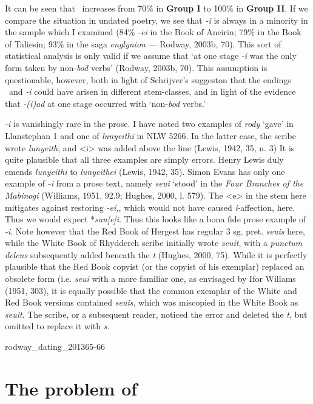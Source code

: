{It can be seen that \ei\ increases from 70\% in \textbf{Group I} to 100\% in \textbf{Group II}. If we compare the situation in undated poetry, we see that \textit{-i} is always in a minority in the sample which I examined (84\% \textit{-ei} in the Book of Aneirin; 79\% in the Book of Taliesin; 93\% in the saga \textit{englynion} --- Rodway, 2003b, 70). This sort of statistical analysis is only valid if we assume that `at one stage \textit{-i} was the only form taken by non-\textit{bod} verbs' (Rodway, 2003b, 70). This assumption is questionable, however, both in light of Schrijver's suggeston that the endings \ei\ and \textit{-i} could have arisen in different stem-classes, and in light of the evidence that \textit{-(i)ad} at one stage occurred with `non-\textit{bod} verbs.'

\textit{-i} is vanishingly rare in the prose. I have noted two examples of \textit{rody} `gave' in Llanstephan 1 and one of \textit{lunyeithi} in NLW 5266. In the latter case, the  scribe wrote \textit{lunyeith}, and <i> was added above the line (Lewis, 1942, 35, n. 3) It is quite plausible that all three examples are simply errors. Henry Lewis duly emends \textit{lunyeithi} to \textit{lunyeithei} (Lewis, 1942, 35). Simon Evans has only one example of \textit{-i} from a prose text, namely \textit{seui} `stood' in the \textit{Four Branches of the Mabinogi} (Williams, 1951, 92.9; Hughes, 2000, l. 579). The <e> in the stem here mitigates against restoring \textit{-ei,}, which would not have caused \textit{i}-affection, here. Thus we would expect *\textit{sau[e]i}. Thus this looks like a bona fide prose example of \textit{-i}. Note however that the Red Book of Hergest has regular 3 sg. pret. \textit{seuis} here, while the White Book of Rhydderch scribe initially wrote \textit{seuit}, with a \textit{punctum delens} subsequently added beneath the \textit{t} (Hughes, 2000, 75). While it is perfectly plausible that the Red Book copyist (or the copyist of his exemplar) replaced an obsolete form (i.e. \textit{seui} with a more familiar one, as envisaged by Ifor Willams (1951, 303), it is equally possible that the common exemplar of the White and Red Book versions contained \textit{seuis}, which was miscopied in the White Book as \textit{seuit}. The scribe, or a subsequent reader, noticed the error and deleted the \textit{t}, but omitted to replace it with \textit{s}.}{rodway_dating_2013}{65-66}

\section{The problem of }

